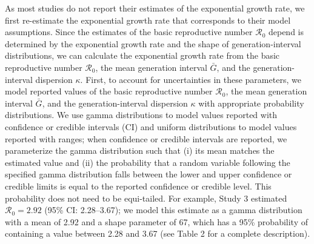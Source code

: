 \documentclass[12pt]{article}
\newcommand{\Ro}{\ensuremath{{\mathcal R}_{0}}\xspace}
\begin{document}
As most studies do not report their estimates of the exponential growth rate, we first re-estimate the exponential growth rate that corresponds to their model assumptions.
Since the estimates of the basic reproductive number \Ro depend is determined by the exponential growth rate and the shape of generation-interval distributions, we can calculate the exponential growth rate from the basic reproductive number \Ro, the mean generation interval $\bar G$, and the generation-interval dispersion $\kappa$.
First, to account for uncertainties in these parameters, we model reported values of the basic reproductive number \Ro, the mean generation interval $\bar G$, and the generation-interval dispersion $\kappa$ with appropriate probability distributions.
We use gamma distributions to model values reported with confidence or credible intervals (CI) and uniform distributions to model values reported with ranges;
when confidence or credible intervals are reported, we parameterize the gamma distribution such that (i) its mean matches the estimated value and (ii) the probability that a random variable following the specified gamma distribution falls between the lower and upper confidence or credible limits is equal to the reported confidence or credible level. 
This probability does not need to be equi-tailed.
For example, Study 3 estimated $\Ro = 2.92$ (95\% CI: 2.28--3.67);
we model this estimate as a gamma distribution with a mean of 2.92 and a shape parameter of 67, which has a 95\% probability of containing a value between 2.28 and 3.67 (see Table 2 for a complete description).
\end{document}
